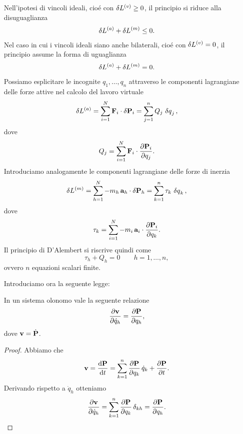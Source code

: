 Nell'ipotesi di vincoli ideali, cioé con $\var{L^{(v)}} \geq 0$, il principio si riduce alla disuguaglianza
\begin{equation*}
    \var{L^{(a)}} + \var{L^{(m)}} \leq 0.
\end{equation*}
Nel caso in cui i vincoli ideali siano anche bilaterali, cioé con  $\var{L^{(v)}} = 0$, il principio assume la forma di uguaglianza
\begin{equation*}
    \var{L^{(a)}} + \var{L^{(m)}} = 0.
\end{equation*}
Possiamo esplicitare le incognite $q_1, \dots, q_n$ attraverso le componenti lagrangiane delle forze attive nel calcolo del lavoro virtuale
\begin{equation*}
    \var{L^{(a)}} = \sum_{i=1}^N \vb{F}_i\cdot \var{\vb{P}}_i = \sum_{j=1}^n Q_j\,\var{q}_j,
\end{equation*} dove
\begin{equation*}
    Q_j = \sum_{i=1}^N \vb{F}_i\cdot \pdv{\vb{P}_i}{q_j}.
\end{equation*}
Introduciamo analogamente le componenti lagrangiane delle forze di inerzia
\begin{equation*}
    \var{L^{(m)}} = \sum_{h=1}^N -m_h\,\vb{a}_h\cdot \var{\vb{P}}_h = \sum_{k=1}^n \tau_k\,\var{q}_k,
\end{equation*}
dove \begin{equation*}
    \tau_k = \sum_{i=1}^N -m_i\,\vb{a}_i\cdot \pdv{\vb{P}_i}{q_k}.
\end{equation*}
Il principio di D'Alembert si riscrive quindi come
\begin{equation*}
    \tau_h + Q_h = 0 \qquad h = 1, \dots, n,
\end{equation*}
ovvero $n$ equazioni scalari finite.

Introduciamo ora la seguente legge:

\begin{lemma}
    In un sistema olonomo vale la seguente relazione
    \begin{equation*}
        \pdv{\vb{v}}{\dot{q}_h} = \pdv{\vb{P}}{q_h},
    \end{equation*}
    dove $\vb{v} = \dot{\vb{P}}$.
\end{lemma}
\begin{proof}
    Abbiamo che
    \begin{equation*}
        \vb{v} = \dv{\vb{P}}{t} = \sum_{k=1}^n \pdv{\vb{P}}{q_k}\,\dot{q}_k + \pdv{\vb{P}}{t}.
    \end{equation*}
    Derivando rispetto a $\dot{q}_h$ otteniamo
    \begin{equation*}
        \pdv{\vb{v}}{\dot{q}_h} = \sum_{k=1}^n \pdv{\vb{P}}{q_k}\,\delta_{kh} = \pdv{\vb{P}}{q_h}.
    \end{equation*}
\end{proof}

